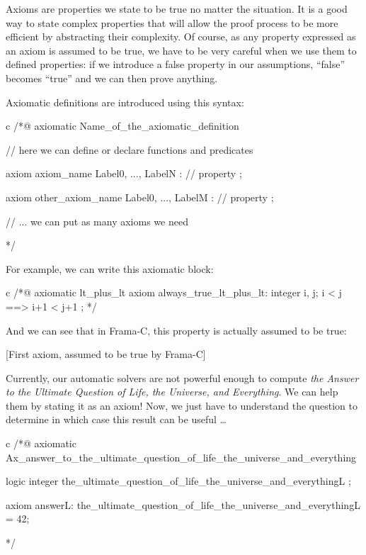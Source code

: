 Axioms are properties we state to be true no matter the situation. It is
a good way to state complex properties that will allow the proof process
to be more efficient by abstracting their complexity. Of course, as any
property expressed as an axiom is assumed to be true, we have to be very
careful when we use them to defined properties: if we introduce a false
property in our assumptions, ``false'' becomes ``true'' and we can then
prove anything.





Axiomatic definitions are introduced using this syntax:



\begin{CodeBlock}{c}
/*@
  axiomatic Name_of_the_axiomatic_definition {
    // here we can define or declare functions and predicates

    axiom axiom_name { Label0, ..., LabelN }:
      // property ;

    axiom other_axiom_name { Label0, ..., LabelM }:
      // property ;

    // ... we can put as many axioms we need
  }
*/
\end{CodeBlock}



For example, we can write this axiomatic block:



\begin{CodeBlock}{c}
/*@
  axiomatic lt_plus_lt{
    axiom always_true_lt_plus_lt:
      \forall integer i, j; i < j ==> i+1 < j+1 ;
  }
*/
\end{CodeBlock}



And we can see that in Frama-C, this property is actually assumed to be
true:



[First axiom, assumed to be true by Frama-C]


\begin{Spoiler}
  Currently, our automatic solvers are not
  powerful enough to compute \emph{the Answer to the Ultimate
    Question of Life, the Universe, and Everything}. We can help
  them by stating it as an axiom! Now, we just have to 
  understand the question to determine in which case this result can be
  useful \ldots{}

\begin{CodeBlock}{c}
/*@
  axiomatic Ax_answer_to_the_ultimate_question_of_life_the_universe_and_everything {
    logic integer the_ultimate_question_of_life_the_universe_and_everything{L} ;

    axiom answer{L}:
      the_ultimate_question_of_life_the_universe_and_everything{L} = 42;
  }
*/
\end{CodeBlock}
\end{Spoiler}


